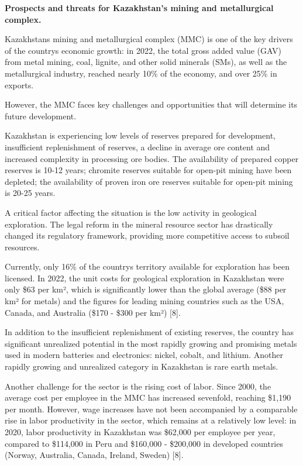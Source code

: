 \begin{multicols}{2}
{\bfseries Prospects and threats for Kazakhstan's mining and metallurgical
complex.}

Kazakhstan\textquotesingle s mining and metallurgical complex (MMC) is
one of the key drivers of the country\textquotesingle s economic growth:
in 2022, the total gross added value (GAV) from metal mining, coal,
lignite, and other solid minerals (SMs), as well as the metallurgical
industry, reached nearly 10\% of the economy, and over 25\% in exports.

However, the MMC faces key challenges and opportunities that will
determine its future development.

Kazakhstan is experiencing low levels of reserves prepared for
development, insufficient replenishment of reserves, a decline in
average ore content and increased complexity in processing ore bodies.
The availability of prepared copper reserves is 10-12 years; chromite
reserves suitable for open-pit mining have been depleted; the
availability of proven iron ore reserves suitable for open-pit mining is
20-25 years.

A critical factor affecting the situation is the low activity in
geological exploration. The legal reform in the mineral resource sector
has drastically changed its regulatory framework, providing more
competitive access to subsoil resources.

Currently, only 16\% of the country\textquotesingle s territory
available for exploration has been licensed. In 2022, the unit costs for
geological exploration in Kazakhstan were only \$63 per km², which is
significantly lower than the global average (\$88 per km² for metals)
and the figures for leading mining countries such as the USA, Canada,
and Australia (\$170 - \$300 per km²) {[}8{]}.

In addition to the insufficient replenishment of existing reserves, the
country has significant unrealized potential in the most rapidly growing
and promising metals used in modern batteries and electronics: nickel,
cobalt, and lithium. Another rapidly growing and unrealized category in
Kazakhstan is rare earth metals.

Another challenge for the sector is the rising cost of labor. Since
2000, the average cost per employee in the MMC has increased sevenfold,
reaching \$1,190 per month. However, wage increases have not been
accompanied by a comparable rise in labor productivity in the sector,
which remains at a relatively low level: in 2020, labor productivity in
Kazakhstan was \$62,000 per employee per year, compared to \$114,000 in
Peru and \$160,000 - \$200,000 in developed countries (Norway,
Australia, Canada, Ireland, Sweden) {[}8{]}.


\end{multicols}
